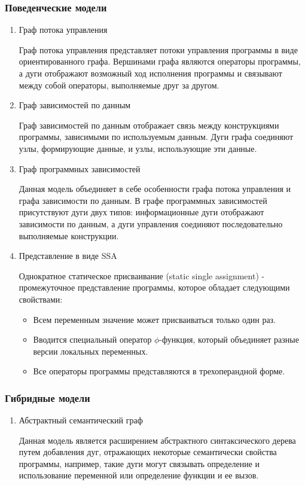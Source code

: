 \subsubsection{Поведенческие модели}
\begin{enumerate}
    \item Граф потока управления

    Граф потока управления представляет потоки управления программы в виде
    ориентированного графа. Вершинами графа являются операторы программы, а дуги
    отображают возможный ход исполнения программы и связывают между собой
    операторы, выполняемые друг за другом.

    \item Граф зависимостей по данным

    Граф зависимостей по данным отображает связь между конструкциями программы,
    зависимыми по используемым данным. Дуги графа соединяют узлы, формирующие
    данные, и узлы, использующие эти данные.

    \item Граф программных зависимостей

    Данная модель объединяет в себе особенности графа потока управления и графа
    зависимости по данным. В графе программных зависимостей присутствуют дуги
    двух типов: информационные дуги отображают зависимости по данным, а
    дуги управления соединяют последовательно выполняемые конструкции.

    \item Представление в виде SSA

    Однократное статическое присваивание (static single assignment) -
    промежуточное представление программы, которое обладает следующими
    свойствами:
        \begin{itemize}
            \item Всем переменным значение может присваиваться только один раз.
            \item Вводится специальный оператор $\phi$-функция, который
            объединяет разные версии локальных переменных.
            \item Все операторы программы представляются в трехоперандной форме.
        \end{itemize}
\end{enumerate}

\subsubsection{Гибридные модели}
\begin{enumerate}
    \item Абстрактный семантический граф

    Данная модель является расширением абстрактного синтаксического дерева путем
    добавления дуг, отражающих некоторые семантически свойства программы,
    например, такие дуги могут связывать определение и использование переменной
    или определение функции и ее вызов.
\end{enumerate}

